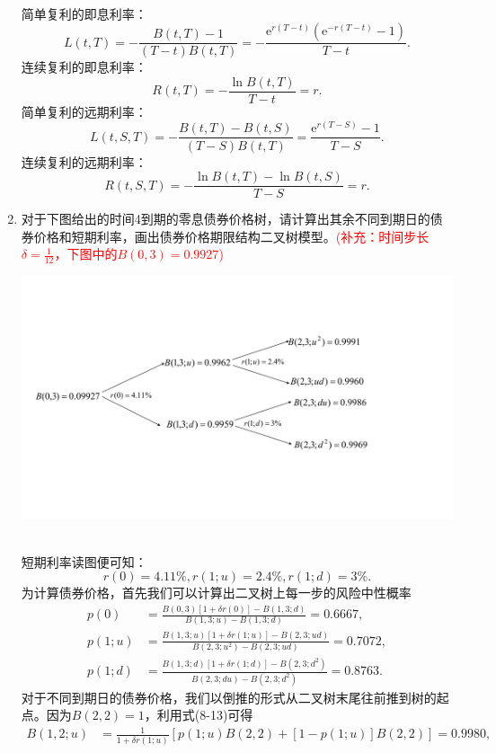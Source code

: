 \begin{enumerate}
    \sol\\
    简单复利的即息利率：
    \[L(t, T) = -\frac{B(t,T) - 1}{(T - t)B(t, T)} = -\frac{\mathrm{e}^{r \left(T - t\right)} \left(\mathrm{e}^{- r \left(T - t\right)} - 1\right)}{T - t}.\]
    连续复利的即息利率：
    \[R(t, T) = -\frac{\ln B(t, T)}{T - t} = r.\]
    简单复利的远期利率：
    \[L(t, S, T) = -\frac{B(t,T)-B(t,S)}{(T-S)B(t,T)}=\frac{\mathrm{e}^{r \left(T - S\right)} - 1}{T - S}.\]
    连续复利的远期利率：
    \[R(t,S,T) = -\frac{\ln B(t,T) - \ln B(t,S)}{T-S} = r.\]
    \item 对于下图给出的时间4到期的零息债券价格树，请计算出其余不同到期日的债券价格和短期利率，画出债券价格期限结构二叉树模型。\textcolor{red}{(补充：时间步长$\displaystyle\delta = \frac{1}{12}$，下图中的$B(0,3)=0.9927$)}
    \begin{center}
        \includegraphics[scale=0.5]{8-4.pdf}
    \end{center}
    \sol\\
    短期利率读图便可知：
    \[r(0)=4.11\%,r(1;u)=2.4\%,r(1;d)=3\%.\]
    为计算债券价格，首先我们可以计算出二叉树上每一步的风险中性概率
    \begin{align*}
        p(0) & = \frac{B(0,3)[1+\delta r(0)]-B(1,3;d)}{B(1,3;u)-B(1,3;d)} = 0.6667,\\
        p(1;u) & = \frac{B(1,3;u)[1+\delta r(1;u)]-B(2,3;ud)}{B(2,3;u^2)-B(2,3;ud)} = 0.7072,\\
        p(1;d) & = \frac{B(1,3;d)[1+\delta r(1;d)]-B(2,3;d^2)}{B(2,3;du)-B(2,3;d^2)} = 0.8763.
    \end{align*}
    对于不同到期日的债券价格，我们以倒推的形式从二叉树末尾往前推到树的起点。因为$B(2,2)=1$，利用式(8-13)可得
    \begin{align*}
        B(1,2;u) & = \frac{1}{1 + \delta r(1;u)}[p(1;u)B(2,2)+[1-p(1;u)]B(2,2)] = 0.9980,\\

\end{align*}
\end{enumerate}
